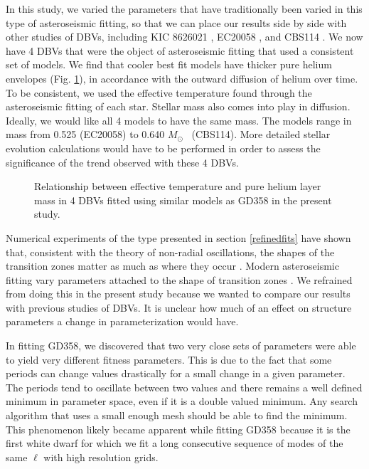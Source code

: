 \documentclass[12pt,preprint]{aastex}
\newcommand{\msun}{$M_\odot$}
\begin{document}
In this study, we varied the parameters that have traditionally been varied in this type of 
asteroseismic fitting, so that we can place our results side by side with other studies of 
DBVs, including KIC 8626021 \citep{Bischoff-Kim14}, EC20058 \citep{Bischoff-Kim11a}, and 
CBS114 \citep{Metcalfe05a}. We now have 4 DBVs that were the object of asteroseismic fitting 
that used a consistent set of models. We find that cooler best fit models have thicker pure 
helium envelopes (Fig. \ref{ffit5}), in accordance with the outward diffusion of helium over time. 
To be consistent, we used the effective temperature found through the asteroseismic fitting of each 
star. Stellar mass also comes into play in diffusion. Ideally, we would like all 4 models to have 
the same mass. The models range in mass from 0.525 (EC20058) to 0.640 \msun ~ (CBS114). More detailed 
stellar evolution calculations would have to be performed in order to assess the significance of the 
trend observed with these 4 DBVs.

\begin{figure}
\caption{
Relationship between effective temperature and pure helium layer mass in 4 DBVs fitted using similar 
models as GD358 in the present study. \label{ffit5}
}
\end{figure}

Numerical experiments of the type presented in section \ref{refinedfits} have shown that, consistent with 
the theory of non-radial oscillations, the shapes of the transition zones matter as much as where 
they occur \citep{Bischoff-Kim15}. Modern asteroseismic fitting vary parameters attached to the shape of 
transition zones \citep{Giammichele15}. We refrained from doing this in the present study because we wanted to 
compare our results with previous studies of DBVs. It is unclear how much of an effect on structure parameters a 
change in parameterization would have.

In fitting GD358, we discovered that two very close sets of parameters were able to yield very different fitness 
parameters. This is due to the fact that some periods can change values drastically for a small change in a given 
parameter. The periods tend to oscillate between two values and there remains a well defined minimum in parameter space, 
even if it is a double valued minimum. Any search algorithm that uses a small enough mesh should be able to find the 
minimum. This phenomenon likely became apparent while fitting GD358 because it is the first white dwarf for which 
we fit a long consecutive sequence of modes of the same $\ell$ with high resolution grids.
\end{document}
